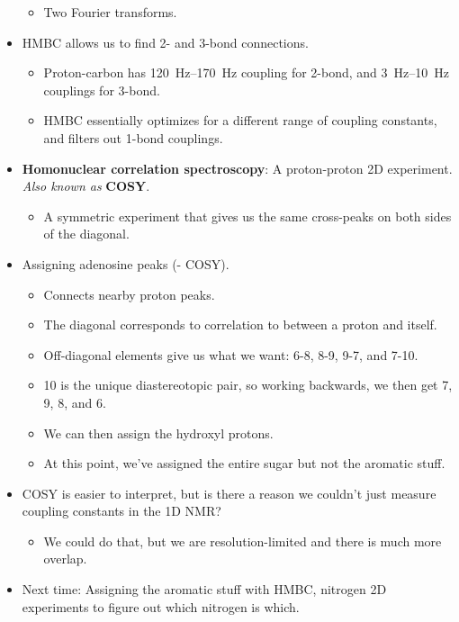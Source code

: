 \documentclass[../notes.tex]{subfiles}
\begin{document}
\begin{itemize}
\begin{itemize}
        \item Two Fourier transforms.
    \end{itemize}
    \item HMBC allows us to find 2- and 3-bond connections.
    \begin{itemize}
        \item Proton-carbon has \SIrange{120}{170}{\hertz} coupling for 2-bond, and \SIrange{3}{10}{\hertz} couplings for 3-bond.
        \item HMBC essentially optimizes for a different range of coupling constants, and filters out 1-bond couplings.
    \end{itemize}
    \item \textbf{Homonuclear correlation spectroscopy}: A proton-proton 2D experiment. \emph{Also known as} \textbf{COSY}.
    \begin{itemize}
        \item A symmetric experiment that gives us the same cross-peaks on both sides of the diagonal.
    \end{itemize}
    \item Assigning adenosine peaks (- COSY).
    \begin{itemize}
        \item Connects nearby proton peaks.
        \item The diagonal corresponds to correlation to between a proton and itself.
        \item Off-diagonal elements give us what we want: 6-8, 8-9, 9-7, and 7-10.
        \item 10 is the unique diastereotopic pair, so working backwards, we then get 7, 9, 8, and 6.
        \item We can then assign the hydroxyl protons.
        \item At this point, we've assigned the entire sugar but not the aromatic stuff.
    \end{itemize}
    \item COSY is easier to interpret, but is there a reason we couldn't just measure coupling constants in the 1D  NMR?
    \begin{itemize}
        \item We could do that, but we are resolution-limited and there is much more overlap.
    \end{itemize}
    \item Next time: Assigning the aromatic stuff with HMBC, nitrogen 2D experiments to figure out which nitrogen is which.
\end{itemize}
\end{document}
